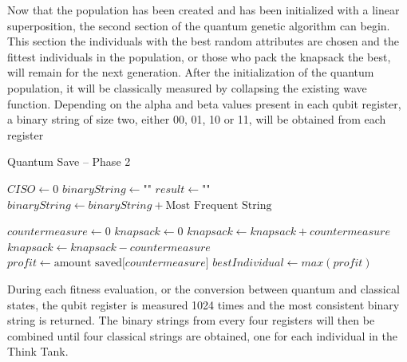 Now that the population has been created and has been initialized with a linear superposition, the second section of the quantum genetic algorithm can begin. This section the individuals with the best random attributes are chosen and the fittest individuals in the population, or those who pack the knapsack the best, will remain for the next generation. After the initialization of the quantum population, it will be classically measured by collapsing the existing wave function. Depending on the alpha and beta values present in each qubit register, a binary string of size two, either 00, 01, 10 or 11, will be obtained from each register 

\begin{algorithm}
\caption{Quantum Save -- Phase 2}
\begin{algorithmic}[1]
\State $CISO \gets 0$
        \State $binaryString \gets \text{""}$
        \State $result \gets \text{""}$
            \State $binaryString \gets binaryString + \text{Most Frequent String}$
        \EndWhile
        
        \State $countermeasure \gets 0$
        \State $knapsack \gets 0$
            \State $knapsack \gets knapsack + countermeasure$
                \State $knapsack \gets knapsack - countermeasure$
            \EndIf
            \State $profit \gets \text{amount saved[}countermeasure\text{]}$
        \EndWhile
        \State $bestIndividual \gets max(profit)$
\end{algorithmic}
\end{algorithm}

During each fitness evaluation, or the conversion between quantum and classical states, the qubit register is measured 1024 times and the most consistent binary string is returned. The binary strings from every four registers will then be combined until four classical strings are obtained, one for each individual in the Think Tank. 

\vspace{1mm}

